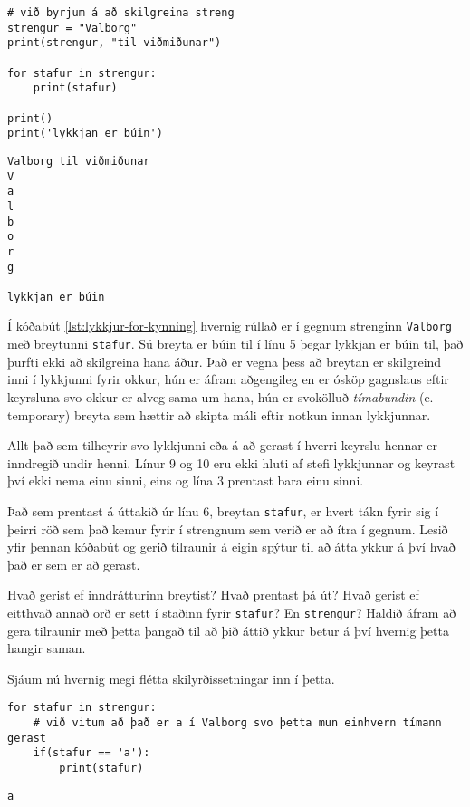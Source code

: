 \newpage {}

\begin{lstlisting}[caption=For lykkjur kynntar, label=lst:lykkjur-for-kynning]
# við byrjum á að skilgreina streng
strengur = "Valborg"
print(strengur, "til viðmiðunar")

for stafur in strengur:
	print(stafur)
	
print()
print('lykkjan er búin')
\end{lstlisting}
\lstset{style=uttak}
\begin{lstlisting}
Valborg til viðmiðunar
V
a
l
b
o
r
g

lykkjan er búin
\end{lstlisting}

Í kóðabút \ref{lst:lykkjur-for-kynning} hvernig rúllað er í gegnum strenginn \texttt{Valborg} með breytunni \texttt{stafur}.
Sú breyta er búin til í línu 5 þegar lykkjan er búin til, það þurfti ekki að skilgreina hana áður.
Það er vegna þess að breytan er skilgreind inni í lykkjunni fyrir okkur, hún er áfram aðgengileg en er ósköp gagnslaus eftir keyrsluna svo okkur er alveg sama um hana, hún er svokölluð \emph{tímabundin} (e. temporary) breyta sem hættir að skipta máli eftir notkun innan lykkjunnar.

Allt það sem tilheyrir svo lykkjunni eða á að gerast í hverri keyrslu hennar er inndregið undir henni.
Línur 9 og 10 eru ekki hluti af stefi lykkjunnar og keyrast því ekki nema einu sinni, eins og lína 3 prentast bara einu sinni.

Það sem prentast á úttakið úr línu 6, breytan \texttt{stafur}, er hvert tákn fyrir sig í þeirri röð sem það kemur fyrir í strengnum sem verið er að ítra í gegnum.
Lesið yfir þennan kóðabút og gerið tilraunir á eigin spýtur til að átta ykkur á því hvað það er sem er að gerast.

Hvað gerist ef inndrátturinn breytist?
Hvað prentast þá út?
Hvað gerist ef eitthvað annað orð er sett í staðinn fyrir \texttt{stafur}?
En \texttt{strengur}?
Haldið áfram að gera tilraunir með þetta þangað til að þið áttið ykkur betur á því hvernig þetta hangir saman.

Sjáum nú hvernig megi flétta skilyrðissetningar inn í þetta.

\lstset{style=venjulegt}
\begin{lstlisting}[caption=For lykkja og skilyrðissetningar, label=lst:lykkjur-for-skil]
for stafur in strengur:
	# við vitum að það er a í Valborg svo þetta mun einhvern tímann gerast
	if(stafur == 'a'):
		print(stafur)
\end{lstlisting}
\lstset{style=uttak}
\begin{lstlisting}
a
\end{lstlisting}

